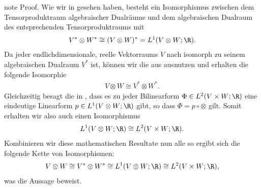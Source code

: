 \documentclass[letterpaper,10pt,english]{jupyterBook}
\begin{document}
\begin{sphinxadmonition}{note}
\sphinxAtStartPar
Proof. Wie wir in {\hyperref[\detokenize{vektoranalysis/tensor:cor:tensorenLinearformen}]{}} gesehen haben, besteht ein Isomorphismus zwischen dem Tensorproduktraum algebraischer Dualräume und dem algebraischen Dualraum des entsprechenden Tensorproduktraums mit
\begin{equation*}
\begin{split}V^\ast \otimes W^\ast \cong (V\otimes W)^\ast = L^1(V \otimes W; \R).\end{split}
\end{equation*}
\sphinxAtStartPar
Da jeder endlich\sphinxhyphen{}dimensionale, reelle Vektorraums \(V\) nach {\hyperref[\detokenize{vektoranalysis/multilinear:lem:dualeBasis}]{}} isomorph zu seinem algebraischen Dualraum \(V^\ast\) ist, können wir die  aus {\hyperref[\detokenize{vektoranalysis/tensor:lem:natISO}]{}} ausnutzen und erhalten die folgende Isomorphie
\begin{equation}\label{equation:vektoranalysis/tensor:eq:transitivIsomorphismus}
\begin{split}V \otimes W \cong V^\ast \otimes W^\ast.\end{split}
\end{equation}
\sphinxAtStartPar
Gleichzeitig besagt die  in , dass es zu jeder Bilinearform \(\Phi \in L^2(V \times W; \R)\) eine eindeutige Linearform \(p \in L^1(V \otimes W; \R)\) gibt, so dass \(\Phi = p \circ \otimes\) gilt.
Somit erhalten wir also auch einen Isomorphismus
\begin{equation*}
\begin{split}L^1(V \otimes W; \R) \cong L^2(V \times W; \R).\end{split}
\end{equation*}
\sphinxAtStartPar
Kombinieren wir diese mathematischen Resultate nun alle so ergibt sich die folgende Kette von Isomorphismen:
\begin{equation*}
\begin{split}V \otimes W \cong V^\ast \otimes W^\ast \cong L^1(V \otimes W; \R) \cong L^2(V \times W; \R),\end{split}
\end{equation*}
\sphinxAtStartPar
was die Aussage beweist.
\end{sphinxadmonition}
\end{document}
